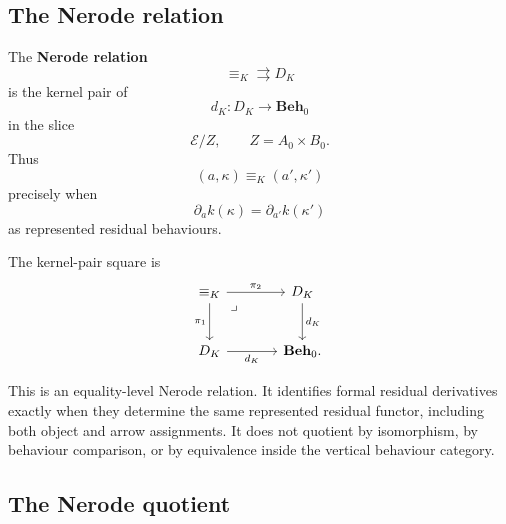 \subsection{The Nerode relation}
\label{subsec:nerode-relation}

\begin{definition}
\label{def:nerode-relation}
    The \textbf{Nerode relation}
    \[
        {\equiv_K}\rightrightarrows D_K
    \]
    is the kernel pair of
    \[
        d_K:D_K\to\mathbf{Beh}_0
    \]
    in the slice
    \[
        \mathcal E/Z,
        \qquad
        Z=A_0\times B_0.
    \]
    Thus
    \[
        (a,\kappa)\equiv_K(a',\kappa')
    \]
    precisely when
    \[
        \partial_a k(\kappa)=\partial_{a'}k(\kappa')
    \]
    as represented residual behaviours.
\end{definition}

The kernel-pair square is
\[
    \begin{tikzcd}[column sep=large, row sep=large]
            {\equiv_K}
                \arrow[r, "\pi_2"]
                \arrow[d, "\pi_1"']
                \arrow[dr, phantom, "\lrcorner", very near start]
        &
            D_K
                \arrow[d, "d_K"]
        \\
            D_K
                \arrow[r, "d_K"']
        &
            \mathbf{Beh}_0.
    \end{tikzcd}
\]

\begin{remark}
\label{rem:equality-level-nerode}
    This is an equality-level Nerode relation. It identifies formal residual derivatives exactly when they determine the same represented residual functor, including both object and arrow assignments. It does not quotient by isomorphism, by behaviour comparison, or by equivalence inside the vertical behaviour category.
\end{remark}

\subsection{The Nerode quotient}
\label{subsec:nerode-quotient}

